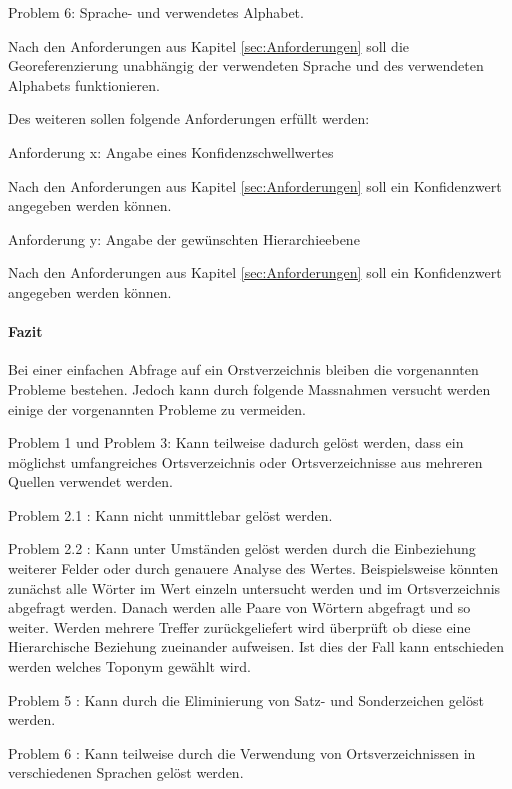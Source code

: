 				Problem 6: Sprache- und verwendetes Alphabet.

				Nach den Anforderungen aus Kapitel \ref{sec:Anforderungen} soll die Georeferenzierung unabhängig der verwendeten Sprache und des verwendeten Alphabets funktionieren.

				Des weiteren sollen folgende Anforderungen erfüllt werden:

				Anforderung x: Angabe eines Konfidenzschwellwertes

				Nach den Anforderungen aus Kapitel \ref{sec:Anforderungen} soll ein Konfidenzwert angegeben werden können.

				Anforderung y: Angabe der gewünschten Hierarchieebene 

				Nach den Anforderungen aus Kapitel \ref{sec:Anforderungen} soll ein Konfidenzwert angegeben werden können.

			\paragraph{Fazit} 

				Bei einer einfachen Abfrage auf ein Orstverzeichnis bleiben die vorgenannten Probleme bestehen.
				Jedoch kann durch folgende Massnahmen versucht werden einige der vorgenannten Probleme zu vermeiden. 

				Problem 1 und Problem 3: Kann teilweise dadurch gelöst werden, dass ein möglichst umfangreiches Ortsverzeichnis oder Ortsverzeichnisse aus mehreren Quellen verwendet werden.   
				
				Problem 2.1 : Kann nicht unmittlebar gelöst werden.
				
				Problem 2.2 : Kann unter Umständen gelöst werden durch die Einbeziehung weiterer Felder oder durch genauere Analyse des Wertes. 
				Beispielsweise könnten zunächst alle Wörter im Wert einzeln untersucht werden und im Ortsverzeichnis abgefragt werden. 
				Danach werden alle Paare von Wörtern abgefragt und so weiter. 
				Werden mehrere Treffer zurückgeliefert wird überprüft ob diese eine Hierarchische Beziehung zueinander aufweisen. 
				Ist dies der Fall kann entschieden werden welches Toponym gewählt wird.     
				
				Problem 5 : Kann durch die Eliminierung von Satz- und Sonderzeichen gelöst werden. 
				
				Problem 6 : Kann teilweise durch die Verwendung von Ortsverzeichnissen in verschiedenen Sprachen gelöst werden. 

